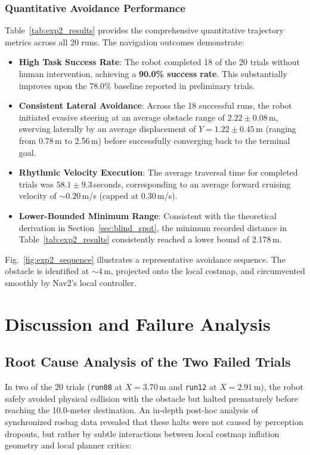 \documentclass[preprint,12pt]{elsarticle}
\begin{document}
\subsubsection{Quantitative Avoidance Performance}
Table~\ref{tab:exp2_results} provides the comprehensive quantitative trajectory metrics across all 20 runs. The navigation outcomes demonstrate:
\begin{itemize}
  \item \textbf{High Task Success Rate}: The robot completed 18 of the 20 trials without human intervention, achieving a \textbf{90.0\% success rate}. This substantially improves upon the 78.0\% baseline reported in preliminary trials.
  \item \textbf{Consistent Lateral Avoidance}: Across the 18 successful runs, the robot initiated evasive steering at an average obstacle range of $2.22 \pm 0.08$\,m, swerving laterally by an average displacement of $Y = 1.22 \pm 0.45$\,m (ranging from 0.78\,m to 2.56\,m) before successfully converging back to the terminal goal.
  \item \textbf{Rhythmic Velocity Execution}: The average traversal time for completed trials was $58.1 \pm 9.3$\,seconds, corresponding to an average forward cruising velocity of $\sim0.20$\,m/s (capped at 0.30\,m/s).
  \item \textbf{Lower-Bounded Minimum Range}: Consistent with the theoretical derivation in Section~\ref{sec:blind_spot}, the minimum recorded distance in Table~\ref{tab:exp2_results} consistently reached a lower bound of 2.178\,m.
\end{itemize}

Fig.~\ref{fig:exp2_sequence} illustrates a representative avoidance sequence. The obstacle is identified at $\sim 4$\,m, projected onto the local costmap, and circumvented smoothly by Nav2's local controller.

\section{Discussion and Failure Analysis}
\label{sec:discussion}

\subsection{Root Cause Analysis of the Two Failed Trials}
\label{subsec:failure_analysis}
In two of the 20 trials (\texttt{run08} at $X=3.70$\,m and \texttt{run12} at $X=2.91$\,m), the robot safely avoided physical collision with the obstacle but halted prematurely before reaching the 10.0-meter destination. An in-depth post-hoc analysis of synchronized rosbag data revealed that these halts were not caused by perception dropouts, but rather by subtle interactions between local costmap inflation geometry and local planner critics:
\end{document}
